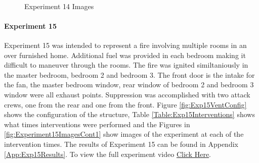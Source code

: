 \documentclass{article}
\begin{document}
\begin{figure}[H]
	\ContinuedFloat 
	\centering 
	 \ 
	\caption{Experiment 14 Images}
	\label{fig:Experiment14ImagesCont3} 
\end{figure}

\paragraph{Experiment 15}\mbox{}

Experiment 15 was intended to represent a fire involving multiple rooms in an over furnished home. Additional fuel was provided in each bedroom making it difficult to maneuver through the rooms. The fire was ignited similtaniously in the master bedroom, bedroom 2 and bedroom 3. The front door is the intake for the fan, the master bedroom window, rear window of bedroom 2 and bedroom 3 window were all exhaust points. Suppression was accomplished with two attack crews, one from the rear and one from the front. Figure \ref{fig:Exp15VentConfig} shows the configuration of the structure, Table \ref{Table:Exp15Interventions} shows what times interventions were performed and the Figures in \ref{fig:Experiment15ImagesCont1} show images of the experiment at each of the intervention times. The results of Experiment 15 can be found in Appendix \ref{App:Exp15Results}. To view the full experiment video \href{https://youtu.be/yoZ9sIg_LEA}{Click Here}.
\end{document}
